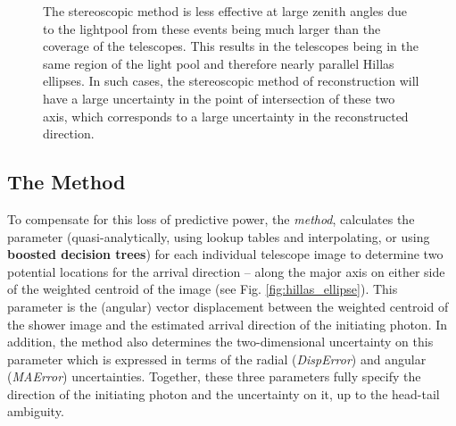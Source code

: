 \documentclass[main.tex]{subfiles}
\begin{document}
\begin{figure}[htbp]
  \centering
  \caption[Stereoscopic reconstruction at LZA.]{The stereoscopic method is less effective at large zenith angles due to the lightpool from these events being much larger than the coverage of the telescopes. This results in the telescopes being in the same region of the light pool and therefore nearly parallel Hillas ellipses. In such cases, the stereoscopic method of reconstruction will have a large uncertainty in the point of intersection of these two axis, which corresponds to a large uncertainty in the reconstructed direction.}
  \label{fig:LZA_lightpool}
\end{figure}


\subsection{The \disp Method}
To compensate for this loss of predictive power, the \disp \textit{method}, calculates the \disp parameter (quasi-analytically, using lookup tables and interpolating, or using \textbf{boosted decision trees}) for each individual telescope image to determine two potential locations for the arrival direction -- along the major axis on either side of the weighted centroid of the image (see Fig. \ref{fig:hillas_ellipse}). This parameter is the (angular) vector displacement between the weighted centroid of the shower image and the estimated arrival direction of the initiating photon. In addition, the method also determines the two-dimensional uncertainty on this parameter which is expressed in terms of the radial ({\it DispError}) and angular ({\it MAError}) uncertainties. Together, these three parameters fully specify the direction of the initiating photon and the uncertainty on it, up to the head-tail ambiguity.
\end{document}
